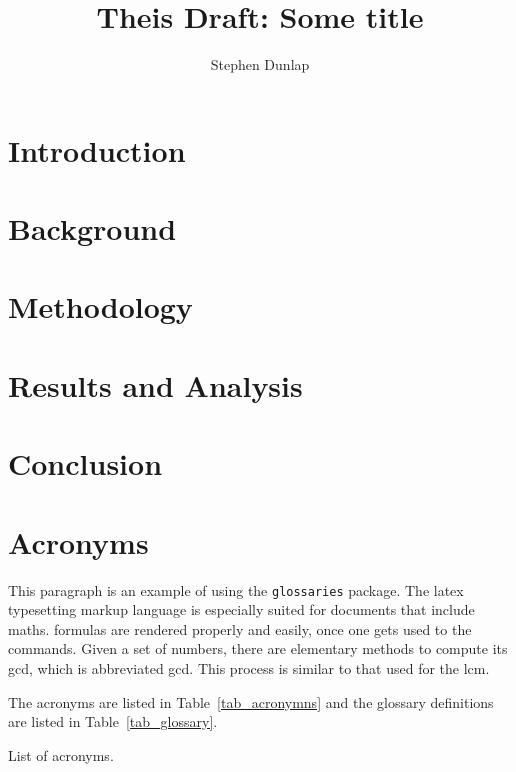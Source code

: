 \documentclass[]{afitthesis}
\title{ Theis Draft: Some title }
\author{ Stephen Dunlap }
\begin{document}
\maketitle %

\chapter{Introduction}




\chapter{Background}


\chapter{Methodology}



\chapter{Results and Analysis}




\chapter{Conclusion}




\appendix %

\chapter{Acronyms}

This paragraph is an example of using the \verb|glossaries| package. The
\Gls{latex} typesetting markup language is especially suited for documents that
include \gls{maths}. \Glspl{formula} are rendered properly and easily, once one
gets used to the commands. Given a set of numbers, there are elementary methods
to compute its \acrlong{gcd}, which is abbreviated \acrshort{gcd}. This process
is similar to that used for the \acrfull{lcm}.

The acronyms are listed in Table~\ref{tab_acronymns} and the glossary
definitions are listed in Table~\ref{tab_glossary}.

\begin{table}[htbp!]
    \centering
    \caption{List of acronyms.}
    \printglossary[type=\acronymtype]
    \label{tab_acronymns}
\end{table}
\end{document}
